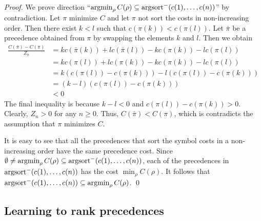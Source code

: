 \begin{proof}
We prove direction ``$\operatorname*{argmin}_\rho C(\rho) \subseteq \operatorname{argsort}^- (c(1), \ldots, c(n))$'' by contradiction.
Let $\pi$ minimize $C$ and let $\pi$ not sort the costs in non-increasing order.
Then there exist $k < l$ such that $c(\pi(k)) < c(\pi(l))$.
Let $\bar{\pi}$ be a precedence obtained from $\pi$ by swapping the elements $k$ and $l$.
Then we obtain
\begin{align*}
\frac{C(\bar{\pi}) - C(\pi)}{Z_n}
&= kc(\bar{\pi}(k)) + lc(\bar{\pi}(l)) - kc(\pi(k)) - lc(\pi(l)) \\
&= kc(\pi(l)) + lc(\pi(k)) - kc(\pi(k)) - lc(\pi(l)) \\
&= k(c(\pi(l)) - c(\pi(k))) - l(c(\pi(l)) - c(\pi(k))) \\
&= (k-l) (c(\pi(l)) - c(\pi(k))) \\
&< 0
\end{align*}
The final inequality is because $k-l < 0$ and $c(\pi(l)) - c(\pi(k)) > 0$.
Clearly, $Z_n > 0$ for any $n \geq 0$.
Thus, $C(\bar{\pi}) < C(\pi)$, which is contradicts the assumption that $\pi$ minimizes $C$.

It is easy to see that all the precedences that sort the symbol costs in a non-increasing order
have the same precedence cost.
Since $\emptyset \neq \operatorname*{argmin}_\rho C(\rho) \subseteq \operatorname{argsort}^- (c(1), \ldots, c(n))$,
each of the precedences in $\operatorname{argsort}^- (c(1), \ldots, c(n))$ has the cost $\min_\rho C(\rho)$.
It follows that $\operatorname{argsort}^- (c(1), \ldots, c(n)) \subseteq \operatorname*{argmin}_\rho C(\rho)$.
\qed
\end{proof}



\subsection{Learning to rank precedences}
\label{sec:ranking}

